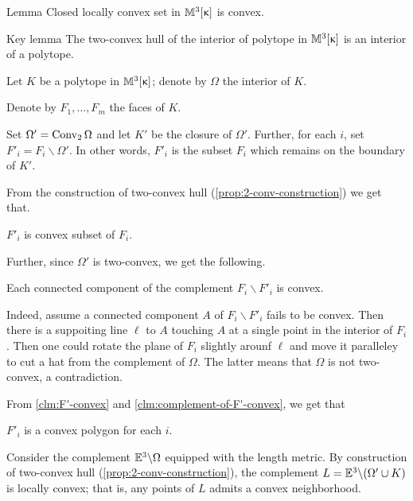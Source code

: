 \begin{thm}{Lemma}
Closed locally convex set in $\mathbb{M}_{{}}^{3}[{\upkappa}]$ is convex. 
\end{thm}




\begin{thm}{Key lemma}
The two-convex hull of the interior of polytope in $\mathbb{M}_{{}}^{3}[{\upkappa}]$
is an interior of a polytope.
\end{thm}

Let $K$ be a polytope in $\mathbb{M}_{{}}^{3}[{\upkappa}]$;
denote by $\Omega$ the interior of $K$.

Denote by $F_1,\dots,F_m$ the faces of $K$.

Set $\Omega'=\mathop{\rm Conv}\nolimits_2\Omega$ and let $K'$ be the closure of $\Omega'$.
Further, 
for each $i$, 
set $F'_i=F_i\backslash \Omega'$.
In other words, 
$F'_i$ is the subset $F_i$ 
which remains on the boundary of $K'$.

From the construction of two-convex hull (\ref{prop:2-conv-construction})
we get that.

\begin{clm}{}\label{clm:F'-convex}
$F'_i$ is convex subset of $F_i$.
\end{clm}

Further, since $\Omega'$ is two-convex,
we get the following.

\begin{clm}{}\label{clm:complement-of-F'-convex}
Each connected component of the complement $F_i\backslash F'_i$ is convex.
\end{clm}

Indeed, assume a connected component $A$ of $F_i\backslash F'_i$ fails to be convex.
Then there is a suppoiting line $\ell$ to $A$ touching $A$ at a single point in the interior of $F_i$.
Then one could rotate the plane of $F_i$ slightly arounf $\ell$ and move it paralleley to cut a hat from the complement of $\Omega$.
The latter means that $\Omega$ is not two-convex, 
a contradiction.
\claimqeds

From \ref{clm:F'-convex} and \ref{clm:complement-of-F'-convex}, we get that 

\begin{clm}{}$F'_i$ is a convex polygon for each $i$.
\end{clm}

Consider the complement 
$\mathbb{E}^3\backslash \Omega$ 
equipped with the length metric.
By construction of two-convex hull (\ref{prop:2-conv-construction}), 
the complement $L=\EE^3\backslash (\Omega'\cup K)$
is locally convex;
that is, any points of $L$ admits a convex neighborhood.

